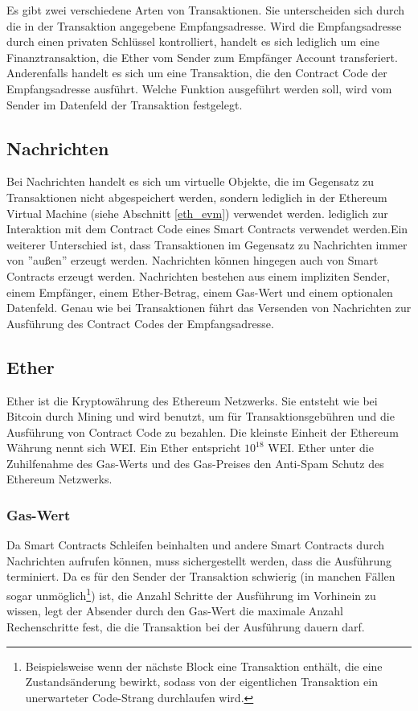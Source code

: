 Es gibt zwei verschiedene Arten von Transaktionen. Sie unterscheiden sich durch die in der Transaktion angegebene Empfangsadresse. 
Wird die Empfangsadresse durch einen privaten Schlüssel kontrolliert, handelt es sich lediglich um eine Finanztransaktion, die Ether vom Sender zum Empfänger Account transferiert. Anderenfalls handelt es sich um eine Transaktion, die den Contract Code der Empfangsadresse ausführt. Welche Funktion ausgeführt werden soll, wird vom Sender im Datenfeld der Transaktion festgelegt.

\subsection{Nachrichten}\label{eth_messages}
Bei Nachrichten handelt es sich um virtuelle Objekte, die im Gegensatz zu Transaktionen nicht abgespeichert werden, sondern lediglich in der Ethereum Virtual Machine (siehe Abschnitt \ref{eth_evm}) verwendet werden. \if lediglich zur Interaktion mit dem Contract Code eines Smart Contracts verwendet werden.\fi Ein weiterer Unterschied ist, dass Transaktionen im Gegensatz zu Nachrichten immer von ''außen'' erzeugt werden. Nachrichten können hingegen auch von Smart Contracts erzeugt werden. Nachrichten bestehen aus einem impliziten Sender, einem Empfänger, einem Ether-Betrag, einem Gas-Wert und einem optionalen Datenfeld. Genau wie bei Transaktionen führt das Versenden von Nachrichten zur Ausführung des Contract Codes der Empfangsadresse.

\subsection{Ether}\label{eth_ether} 
Ether ist die Kryptowährung des Ethereum Netzwerks. Sie entsteht wie bei Bitcoin durch Mining und wird benutzt, um für Transaktionsgebühren und die Ausführung von Contract Code zu bezahlen. Die kleinste Einheit der Ethereum Währung nennt sich WEI. Ein Ether entspricht $10^{18}$ WEI. Ether unter die Zuhilfenahme des Gas-Werts und des Gas-Preises den Anti-Spam Schutz des Ethereum Netzwerks.
\subsubsection{Gas-Wert}
Da Smart Contracts Schleifen beinhalten und andere Smart Contracts durch Nachrichten aufrufen können, muss sichergestellt werden, dass die Ausführung terminiert. Da es für den Sender der Transaktion schwierig (in manchen Fällen sogar unmöglich\footnote{Beispielsweise wenn der nächste Block eine Transaktion enthält, die eine Zustandsänderung bewirkt, sodass von der eigentlichen Transaktion ein unerwarteter Code-Strang durchlaufen wird.}) ist, die Anzahl Schritte der Ausführung im Vorhinein zu wissen, legt der Absender durch den Gas-Wert die maximale Anzahl Rechenschritte fest, die die Transaktion bei der Ausführung dauern darf.
